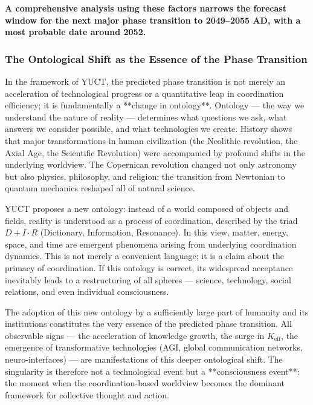 \documentclass[12pt,a4paper]{article}
\theoremstyle{remark}
\begin{document}
	\textbf{A comprehensive analysis using these factors narrows the forecast window for the next major phase transition to 2049–2055 AD, with a most probable date around 2052.}
	
	\subsubsection{The Ontological Shift as the Essence of the Phase Transition}
	\label{subsubsec:ontological-shift}
	
	In the framework of YUCT, the predicted phase transition is not merely an acceleration of technological progress or a quantitative leap in coordination efficiency; it is fundamentally a **change in ontology**. Ontology — the way we understand the nature of reality — determines what questions we ask, what answers we consider possible, and what technologies we create. History shows that major transformations in human civilization (the Neolithic revolution, the Axial Age, the Scientific Revolution) were accompanied by profound shifts in the underlying worldview. The Copernican revolution changed not only astronomy but also physics, philosophy, and religion; the transition from Newtonian to quantum mechanics reshaped all of natural science.
	
	YUCT proposes a new ontology: instead of a world composed of objects and fields, reality is understood as a process of coordination, described by the triad \(D + I \cdot R\) (Dictionary, Information, Resonance). In this view, matter, energy, space, and time are emergent phenomena arising from underlying coordination dynamics. This is not merely a convenient language; it is a claim about the primacy of coordination. If this ontology is correct, its widespread acceptance inevitably leads to a restructuring of all spheres — science, technology, social relations, and even individual consciousness.
	
	The adoption of this new ontology by a sufficiently large part of humanity and its institutions constitutes the very essence of the predicted phase transition. All observable signs — the acceleration of knowledge growth, the surge in \(K_{\text{eff}}\), the emergence of transformative technologies (AGI, global communication networks, neuro-interfaces) — are manifestations of this deeper ontological shift. The singularity is therefore not a technological event but a **consciousness event**: the moment when the coordination-based worldview becomes the dominant framework for collective thought and action.
	
\end{document}
